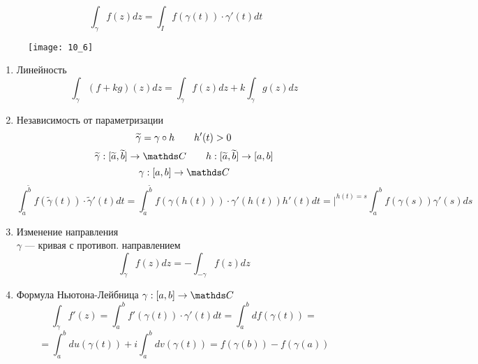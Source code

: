 \documentclass[main]{subfiles}
\begin{document}
    \begin{Definition}
        \[\int_\gamma f(z)dz = \int_I f(\gamma(t)) \cdot \gamma'(t)dt\]
        \begin{figure}[H]
            \centering
            \texttt{[image: 10\_6]}
        \end{figure}
    \end{Definition}

    \begin{properties}
        \begin{enumerate}
            \item Линейность
                  \[\int_\gamma (f + kg)(z)dz = \int_\gamma f(z)dz + k\int_\gamma g(z)dz \]
            \item Независимость от параметризации
                  \[\widetilde{\gamma} = \gamma \circ h \qquad h'(t) > 0\]
                  \[\widetilde{\gamma} : [\widetilde{a}, \widetilde{b}] \to \CC \qq h : [\widetilde{a}, \widetilde{b}] \ra [a,b]\]
                  \[\gamma: [a, b] \to \CC\]
                  \[\int_{\widetilde{a}}^{\widetilde{b}} f(
                      \widetilde{\gamma}(t)) \cdot \widetilde{\gamma}'(t)dt =
                      \int_{\widetilde{a}}^{\widetilde{b}} f(\gamma(h(t))) \cdot \gamma'(h(t))
                      h'(t) dt = \bigg|^{h(t) = s}  \int_a^b f(\gamma(s))\gamma'(s)ds\]
            \item Изменение направления \\
                  $\gamma$ --- кривая с противоп. направлением
                  \[\int_\gamma f(z)dz = -\int_{-\gamma} f(z)dz \]
            \item Формула Ньютона-Лейбница \qq $\gamma: [a, b] \to \CC$
                  \[\int_\gamma f'(z) = \int_a^b f'(\gamma(t)) \cdot \gamma'(t)dt =
                      \int_a^b df(\gamma(t)) = \]
                  \[= \int_a^b du(\gamma(t)) + i\int_a^b dv(\gamma(t)) =
                      f(\gamma(b)) - f(\gamma(a))\]
        \end{enumerate}
    \end{properties}
\end{document}
